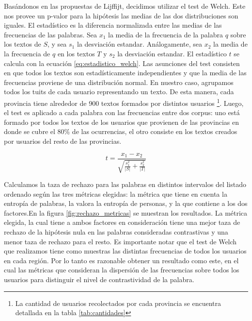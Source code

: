 Basándonos en las propuestas de Lijffijt, decidimos utilizar el test de Welch. Este nos provee un p-valor para la hipótesis las medias de las dos distribuciones son iguales. El estadístico es la diferencia normalizada entre las medias de las frecuencias de las palabras. Sea $x_1$ la media de la frecuencia de la palabra $q$ sobre los textos de $S$, y sea $s_1$ la desviación estandar. Análogamente, sea $x_2$ la media de la frecuencia de $q$ en los textos $T$ y $s_2$ la desviación estandar. El estadístico $t$ se calcula con la ecuación \ref{eq:estadistico_welch}. Las asunciones del test consisten en que todos los textos son estadísticamente independientes y que la media de las frecuencias proviene de una distribución normal. En nuestro caso, agrupamos todos los tuits de cada usuario representando un texto. De esta manera, cada provincia tiene alrededor de 900 textos formados por distintos usuarios \footnote{La cantidad de usuarios recolectados por cada provincia se encuentra detallada en la tabla \ref{tab:cantidades}}. Luego, el test es aplicado a cada palabra con las frecuencias entre dos corpus: uno está formado por todos los textos de los usuarios que provienen de las provincias en donde se cubre el 80\% de las ocurrencias, el otro consiste en los textos creados por usuarios del resto de las provincias.

\begin{equation}
\label{eq:estadistico_welch}
 t = \frac{x_1-x_2}{\sqrt{\frac{s_1^2}{\lvert S \rvert}+\frac{s_2^2}{\lvert T \rvert}}}  
\end{equation}

Calculamos la taza de rechazo para las palabras en distintos intervalos del listado ordenado según las tres métricas elegidas: la métrica que tiene en cuenta la entropía de palabras, la valora la entropía de personas, y la que contiene a los dos factores.En la figura \ref{fig:rechazo_metricas} se muestran los resultados. La métrica elegida, la cual tiene a ambos factores en consideración tiene una mejor taza de rechazo de la hipótesis nula en las palabras consideradas contrastivas y una menor taza de rechazo para el resto. 
Es importante notar que el test de Welch que realizamos tiene como muestras las distintas frecuencias de todos los usuarios en cada región. Por lo tanto es razonable obtener un resultado como este, en el cual las métricas que consideran la dispersión de las frecuencias sobre todos los usuarios para distinguir el nivel de contrastividad de la palabra.

